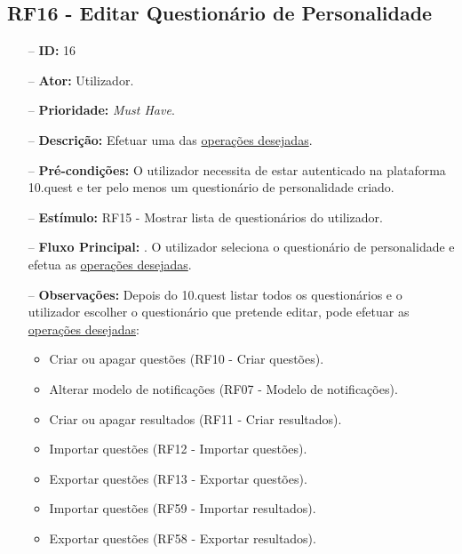 \subsection{RF16 - Editar Questionário de Personalidade}
\begin{itemize}
	\item[--] \textbf{ID:} 16
	\item[--]  \textbf{Ator:} Utilizador.
	\item[--]  \textbf{Prioridade:} \textit{Must Have}.
	\item[--]  \textbf{Descrição:} Efetuar uma das \underline{operações desejadas}.
	\item[--]  \textbf{Pré-condições:} O utilizador necessita de estar autenticado na plataforma 10.quest e ter pelo menos um questionário de personalidade criado.
	\item[--]  \textbf{Estímulo:} RF15 - Mostrar lista de questionários do utilizador.
	\item[--]  \textbf{Fluxo Principal:} 
		. O utilizador seleciona o questionário de personalidade e efetua as \underline{operações desejadas}.
	\item[--]  \textbf{Observações:} Depois do 10.quest listar todos os questionários e o utilizador escolher o questionário que pretende editar, pode efetuar as \underline{operações desejadas}:
	\begin{itemize}
		\item Criar ou apagar questões (RF10 - Criar questões).
		\item Alterar modelo de notificações (RF07 - Modelo de notificações).
		\item Criar ou apagar resultados (RF11 - Criar resultados).
		\item Importar questões (RF12 - Importar questões).
		\item Exportar questões (RF13 - Exportar questões).
		\item Importar questões (RF59 - Importar resultados).
		\item Exportar questões (RF58 - Exportar resultados).
	\end{itemize}
\end{itemize}
\newpage


